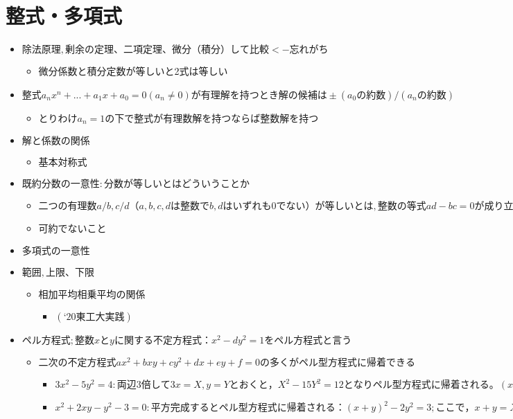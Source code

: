 \documentclass[dvipdfmx,uplatex]{jsarticle}
\begin{document}
\section{整式・多項式}
\begin{itemize}
	\item $ 除法原理,剰余の定理、二項定理、微分（積分）して比較<-忘れがち$
	\begin{itemize}
		\item 微分係数と積分定数が等しいと2式は等しい
	\end{itemize}
	\item $ 整式a_nx^n+...+a_1x+a_0=0(a_n≠0)が有理解を持つとき解の候補は±(a_0の約数)/(a_nの約数)$
	\begin{itemize}
		\item $ とりわけa_n=1の下で整式が有理数解を持つならば整数解を持つ$
	\end{itemize}
	\item $ 解と係数の関係$
	\begin{itemize}
		\item $ 基本対称式$
	\end{itemize}
	\item $ 既約分数の一意性:分数が等しいとはどういうことか$
	\begin{itemize}
		\item $ 二つの有理数 a/b, c/d（a, b, c, d は整数で b, d はいずれも 0 でない）が等しいとは,整数の等式ad - bc = 0が成り立つことを言う$
		\item $ 可約でないこと$
	\end{itemize}
	\item $ 多項式の一意性$
	\item $ 範囲,上限、下限$
	\begin{itemize}
		\item $ 相加平均相乗平均の関係$
		\begin{itemize}
			\item $ (‘20東工大実践)$
		\end{itemize}
	\end{itemize}
	\item $ペル方程式;整数 x と y に関する不定方程式：x^2−dy^2=1 をペル方程式と言う$
	\begin{itemize}
		\item $二次の不定方程式 ax^2+bxy+cy^2+dx+ey+f=0 の多くがペル型方程式に帰着できる$
		\begin{itemize}
			\item $3x^2-5y^2=4: 両辺 3 倍して 3x=X,y=Y とおくと，X^2−15Y^2=12 となりペル型方程式に帰着される。(x,y) が整数なら (X,Y) も整数なので上記のペル型方程式の整数解(X,Y) が求まればもとの整数解も全て求まる。$
			\item $x^2+2xy-y^2-3=0: 平方完成するとペル型方程式に帰着される：(x+y)^2−2y^2=3;ここで，x+y=X,y=Y とおくと，X^2−2Y^2=3 となる。(x,y) が整数なら (X,Y) も整数なので上記のペル型方程式の整数解(X,Y) が求まればもとの整数解も全て求まる。$
		\end{itemize}
	\end{itemize}
\end{itemize}
\end{document}
